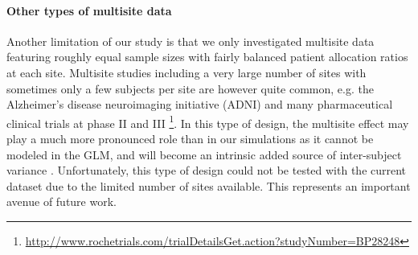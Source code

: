 \documentclass[authoryear]{elsarticle}
\begin{document}
\paragraph{Other types of multisite data} Another limitation of our study is that we only investigated multisite data featuring roughly equal sample sizes with fairly balanced patient allocation ratios at each site. Multisite studies including a very large number of sites with sometimes only a few subjects per site are however quite common, e.g. the Alzheimer's disease neuroimaging initiative (ADNI) \citep{Mueller2005} and many pharmaceutical clinical trials at phase II and III \footnote{\url{http://www.rochetrials.com/trialDetailsGet.action?studyNumber=BP28248}}. In this type of design, the multisite effect may play a much more pronounced role than in our simulations as it cannot be modeled in the GLM, and will become an intrinsic added source of inter-subject variance \citep{Feaster2011}. Unfortunately, this type of design could not be tested with the current dataset due to the limited number of sites available. This represents an important avenue of future work. 
\end{document}
